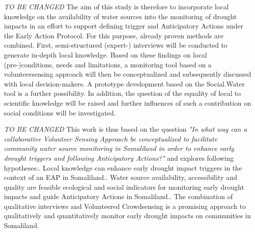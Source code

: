 \textit{TO BE CHANGED}\newline
The aim of this study is therefore to incorporate local knowledge on the availability of water sources into the monitoring of drought impacts in an effort to support defining trigger and Anticipatory Actions under the Early Action Protocol. For this purpose, already proven methods are combined. First, semi-structured (expert-) interviews will be conducted to generate in-depth local knowledge. Based on these findings on local (pre-)conditions, needs and limitations, a monitoring tool based on a volunteersensing approach will then be conceptualized and subsequently discussed with local decision-makers. A prototype development based on the Social.Water tool is a further possibility. In addition, the question of the equality of local to scientific knowledge will be raised and further influences of such a contribution on social conditions will be investigated.

\textit{TO BE CHANGED}\newline
This work is thus based on the question \textit{"In what way can a collaborative Volunteer Sensing Approach be conceptualized to facilitate community water source monitoring in Somaliland in order to enhance early drought triggers and following Anticipatory Actions?"} and explores following hypotheses:. Local knowledge can enhance early drought impact triggers in the context of an EAP in Somaliland.. Water source availability, accessibility and quality are feasible ecological and social indicators for monitoring early drought impacts and guide Anticipatory Actions in Somaliland.. The combination of qualitative interviews and Volunteered Crowdsensing is a promising approach to qualitatively and quantitatively monitor early drought impacts on communities in Somaliland.\newline

